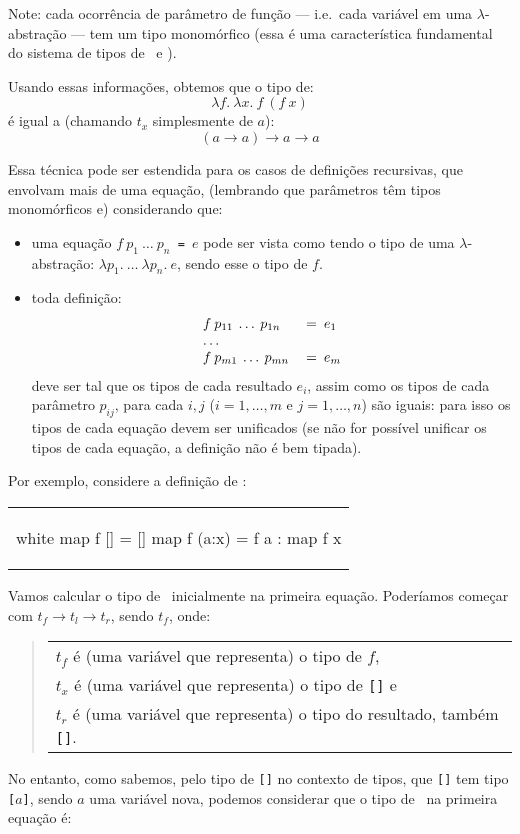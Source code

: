 Note: cada ocorrência de parâmetro de função --- i.e.~cada variável em
uma $\lambda$-abstração --- tem um tipo monomórfico (essa é uma
característica fundamental do sistema de tipos de \ML\ e \Haskell).

Usando essas informações, obtemos que o tipo de:
\[ \lambda f.\:\lambda x.\:f\:(f\:x) \]
é igual a (chamando $t_x$ simplesmente de $a$):
\[ (a \rightarrow a) \rightarrow a \rightarrow a \]

Essa técnica pode ser estendida para os casos de definições
recursivas, que envolvam mais de uma equação, (lembrando que
parâmetros têm tipos monomórficos e) considerando que:

\begin{itemize}
  \item uma equação {\tt $f\: p_1\: \ldots\: p_n$ = $e$} pode ser vista
    como tendo o tipo de uma $\lambda$-abstração: {\tt $\lambda p_1.\:
      \ldots\: \lambda p_n.\: e$}, sendo esse o tipo de $f$.
  \item toda definição:
    {\texttt{ \[\begin{array}[t]{ll}
                  f\: p_{11}\: \ldots\: p_{1n}\: & = \:e_1\\
                  \ldots & \\
                  f\: p_{m1}\: \ldots\: p_{mn}\: & = \:e_m
        \end{array}\]}}
      deve ser tal que os tipos de cada resultado $e_i$, assim como os
      tipos de cada parâmetro $p_{ij}$, para cada $i,j$
      ($i=1,\ldots,m$ e $j=1,\ldots,n$) são iguais: para isso os tipos
      de cada equação devem ser unificados (se não for possível
      unificar os tipos de cada equação, a definição não é bem
      tipada).
      
\end{itemize}

Por exemplo, considere a definição de \map:

\begin{center}
\begin{tabular}{l}
\begin{alg}{.9\textwidth}{white}
  map f []    = [] 
  map f (a:x) = f a : map f x
\end{alg}
\end{tabular}
\end{center}

Vamos calcular o tipo de \map\ inicialmente na primeira
equação. Poderíamos começar com $t_f \rightarrow t_l \rightarrow t_r$, sendo
$t_f$, onde:
\begin{quotation}
  \begin{tabular}{l}
        $t_f$ é (uma variável que representa) o tipo de $f$,  \\
        $t_x$ é (uma variável que representa) o tipo de {\tt []} e \\
        $t_r$ é (uma variável que representa) o tipo do resultado, também {\tt []}.
  \end{tabular}
 \end{quotation}
No entanto, como sabemos, pelo tipo de {\tt []} no contexto de tipos,
que {\tt []} tem tipo {\tt [$a$]}, sendo $a$ uma variável nova,
podemos considerar que o tipo de \map\ na primeira equação é:

